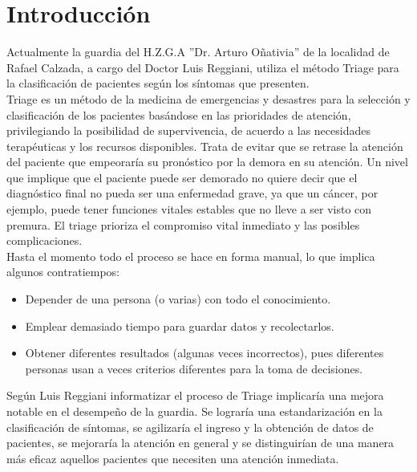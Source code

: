 \section{Introducción}

Actualmente la guardia del H.Z.G.A ''Dr. Arturo Oñativia'' de la localidad de Rafael Calzada, a cargo del Doctor Luis Reggiani, utiliza el método Triage \cite{Derlet,Manual} para la clasificación de pacientes según los síntomas que presenten.  \\
Triage es un método de la medicina de emergencias y desastres para la selección y clasificación de los pacientes basándose en las prioridades de atención, privilegiando la posibilidad de supervivencia, de acuerdo a las necesidades terapéuticas y los recursos disponibles. Trata de evitar que se retrase la atención del paciente que empeoraría su pronóstico por la demora en su atención. Un nivel que implique que el paciente puede ser demorado no quiere decir que el diagnóstico final no pueda ser una enfermedad grave, ya que un cáncer, por ejemplo, puede tener funciones vitales estables que no lleve a ser visto con premura. El triage prioriza el compromiso vital inmediato y las posibles complicaciones.\\
Hasta el momento todo el proceso se hace en forma manual, lo que implica algunos contratiempos:
\begin{itemize}
\item Depender de una persona (o varias) con todo el conocimiento.
\item Emplear demasiado tiempo para guardar datos y recolectarlos.
\item Obtener diferentes resultados (algunas veces incorrectos), pues diferentes personas usan a veces criterios diferentes para la toma de decisiones.
\end{itemize}
Según Luis Reggiani informatizar el proceso de Triage implicaría una mejora notable en el desempeño de la guardia. Se lograría una estandarización en la clasificación de síntomas, se agilizaría el ingreso y la obtención de datos de pacientes, se mejoraría la atención en general y se distinguirían de una manera más eficaz aquellos pacientes que necesiten una atención inmediata.\\



